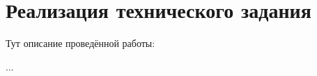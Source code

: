\section{Реализация технического задания}

Тут описание проведённой работы:

\begin{itemize*}
\item ...
\end{itemize*}
